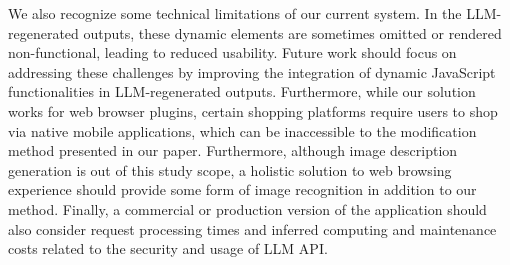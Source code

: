 
We also recognize some technical limitations of our current system. In the LLM-regenerated outputs, these dynamic elements are sometimes omitted or rendered non-functional, leading to reduced usability. Future work should focus on addressing these challenges by improving the integration of dynamic JavaScript functionalities in LLM-regenerated outputs. Furthermore, while our solution works for web browser plugins, certain shopping platforms require users to shop via native mobile applications, which can be inaccessible to the modification method presented in our paper. Furthermore, although image description generation is out of this study scope, a holistic solution to web browsing experience should provide some form of image recognition in addition to our method. Finally, a commercial or production version of the application should also consider request processing times and inferred computing and maintenance costs related to the security and usage of LLM API. 